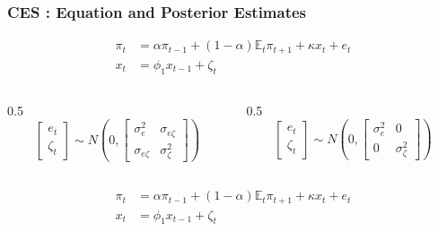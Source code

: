 \documentclass{beamer}
\begin{document}
\begin{frame}
  \frametitle{CES : Equation and Posterior Estimates}
    \begin{equation*}
    \begin{aligned}
        \pi_t &= \alpha \pi_{t-1} + (1-\alpha)\mathbb{E}_t \pi_{t+1} + \kappa x_t + e_t \\
        x_t &= \phi_1 x_{t-1} + \zeta_t 
    \end{aligned}
    \end{equation*}
     \begin{columns}
  \begin{column}{0.5\textwidth}
  \begin{equation*}
    \begin{bmatrix}
      e_t \\
      \zeta_t
    \end{bmatrix}
    \sim N\!\left(
    0,
    \begin{bmatrix}
      \sigma_e^2 & \sigma_{e\zeta} \\
      \sigma_{e\zeta} & \sigma_\zeta^2
    \end{bmatrix}
    \right)
  \end{equation*}
  \end{column}
  \begin{column}{0.5\textwidth}
  \begin{equation*}
    \begin{bmatrix}
      e_t \\
      \zeta_t
    \end{bmatrix}
    \sim N\!\left(
    0,
    \begin{bmatrix}
      \sigma_e^2 & 0 \\
      0 & \sigma_\zeta^2
    \end{bmatrix}
    \right)
  \end{equation*}
  \end{column}
  \end{columns}
\end{frame}
\begin{frame}
    \begin{equation*}
    \begin{aligned}
        \pi_t &= \alpha \pi_{t-1} + (1-\alpha)\mathbb{E}_t \pi_{t+1} + \kappa x_t + e_t \\
        x_t &= \phi_1 x_{t-1} + \zeta_t 
    \end{aligned}
    \end{equation*}
  \begin{table}
    \centering
    \resizebox{\textwidth}{!}{
      
      }
      \caption{Posterior means of parameters.}
    \end{table}
\end{frame}
\end{document}
